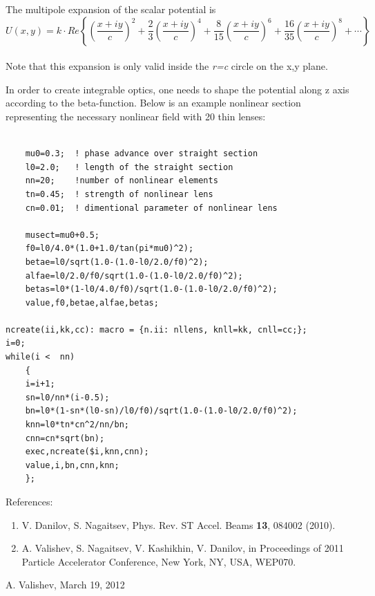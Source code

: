The multipole expansion of the scalar potential is
\\
\[
U(x,y)=k\cdot Re\left\{ \left(\dfrac{x + i y}{c}\right)^2 + \frac{2}{3}\left(\dfrac{x + i y}{c}\right)^4 + \frac{8}{15}\left(\dfrac{x + i y}{c}\right)^6 + \frac{16}{35}\left(\dfrac{x + i y}{c}\right)^8 + \cdots \right\}
\]
\\ Note that this expansion is only valid inside the \textit{r=c} circle on the x,y plane.   

In order to create integrable optics, one needs to shape the potential along z axis according to the beta-function. Below is an example nonlinear section representing the necessary nonlinear field with 20 thin lenses: 
\begin{verbatim}

    mu0=0.3;  ! phase advance over straight section
    l0=2.0;   ! length of the straight section
    nn=20;    !number of nonlinear elements
    tn=0.45;  ! strength of nonlinear lens
    cn=0.01;  ! dimentional parameter of nonlinear lens

    musect=mu0+0.5;
    f0=l0/4.0*(1.0+1.0/tan(pi*mu0)^2);
    betae=l0/sqrt(1.0-(1.0-l0/2.0/f0)^2);
    alfae=l0/2.0/f0/sqrt(1.0-(1.0-l0/2.0/f0)^2);
    betas=l0*(1-l0/4.0/f0)/sqrt(1.0-(1.0-l0/2.0/f0)^2);
    value,f0,betae,alfae,betas;

ncreate(ii,kk,cc): macro = {n.ii: nllens, knll=kk, cnll=cc;};
i=0;
while(i <  nn)
    {
    i=i+1;
    sn=l0/nn*(i-0.5);
    bn=l0*(1-sn*(l0-sn)/l0/f0)/sqrt(1.0-(1.0-l0/2.0/f0)^2);
    knn=l0*tn*cn^2/nn/bn;
    cnn=cn*sqrt(bn);
    exec,ncreate($i,knn,cnn);
    value,i,bn,cnn,knn;
    };

\end{verbatim}
References:

\begin{enumerate}
	\item V. Danilov, S. Nagaitsev, Phys. Rev. ST Accel. Beams \textbf{13}, 084002 (2010).
    
	\item A. Valishev, S. Nagaitsev, V. Kashikhin, V. Danilov, in Proceedings of 2011 Particle Accelerator Conference, New York, NY, USA, WEP070.

\end{enumerate}
A. Valishev, March 19, 2012


